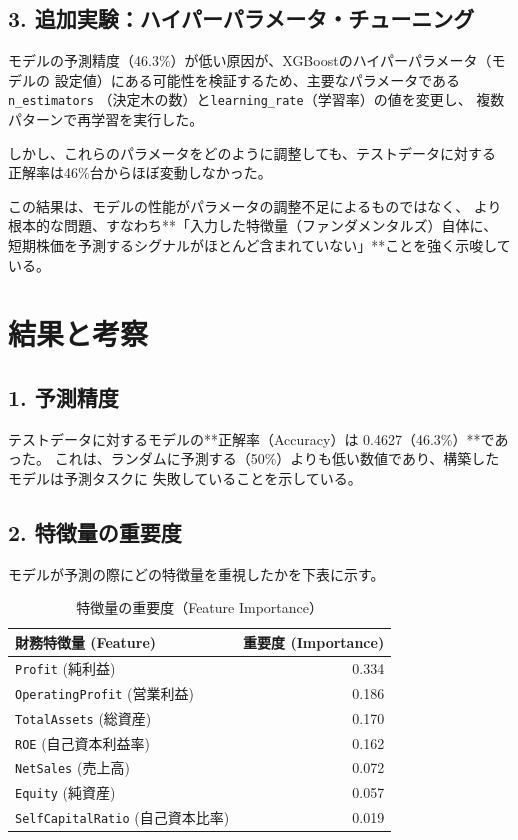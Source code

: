 \documentclass[a4paper, 11pt]{ltjsarticle}
\begin{document}
\subsection*{3. 追加実験：ハイパーパラメータ・チューニング}
モデルの予測精度（46.3\%）が低い原因が、XGBoostのハイパーパラメータ（モデルの
設定値）にある可能性を検証するため、主要なパラメータである\texttt{n\_estimators}
（決定木の数）と\texttt{learning\_rate}（学習率）の値を変更し、
複数パターンで再学習を実行した。

しかし、これらのパラメータをどのように調整しても、テストデータに対する
正解率は46\%台からほぼ変動しなかった。

この結果は、モデルの性能がパラメータの調整不足によるものではなく、
より根本的な問題、すなわち**「入力した特徴量（ファンダメンタルズ）自体に、
短期株価を予測するシグナルがほとんど含まれていない」**ことを強く示唆している。
\section{結果と考察}
\subsection*{1. 予測精度}
テストデータに対するモデルの**正解率（Accuracy）は 0.4627（46.3\%）**であった。
これは、ランダムに予測する（50\%）よりも低い数値であり、構築したモデルは予測タスクに
失敗していることを示している。

\subsection*{2. 特徴量の重要度}
モデルが予測の際にどの特徴量を重視したかを下表に示す。

\begin{table}[h]
  \centering
  \caption{特徴量の重要度（Feature Importance）}
  \begin{tabular}{lr}
    \toprule
    財務特徴量 (Feature) & 重要度 (Importance) \\
    \midrule
    \texttt{Profit} (純利益) & 0.334 \\
    \texttt{OperatingProfit} (営業利益) & 0.186 \\
    \texttt{TotalAssets} (総資産) & 0.170 \\
    \texttt{ROE} (自己資本利益率) & 0.162 \\
    \texttt{NetSales} (売上高) & 0.072 \\
    \texttt{Equity} (純資産) & 0.057 \\
    \texttt{SelfCapitalRatio} (自己資本比率) & 0.019 \\
    \bottomrule
  \end{tabular}
\end{table}
\end{document}
